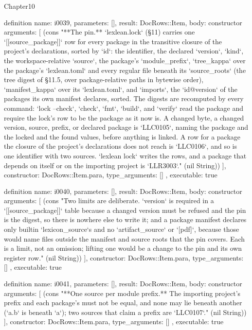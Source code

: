 \begin{lexlean}{Chapter10}
\begin{semanticmodule}
definition{
  name: i0039,
  parameters: [],
  result: DocRows::Item,
  body: constructor{
    arguments: [
      (cons "**The pin.** `lexlean.lock` (§11) carries one `[[source_package]]` row for every package in the transitive closure of the project's declarations, sorted by `id`: the identifier, the declared `version`, `kind`, the workspace-relative `source`, the package's `module_prefix`, `tree_kappa` over the package's `lexlean.toml` and every regular file beneath its `source_roots` (the tree digest of §11.5, over package-relative paths in bytewise order), `manifest_kappa` over its `lexlean.toml`, and `imports`, the `id@version` of the packages its own manifest declares, sorted. The digests are recomputed by every command: `lock --check`, `check`, `fmt`, `build`, and `verify` read the package and require the lock's row to be the package as it now is. A changed byte, a changed version, source, prefix, or declared package is `LLC0105`, naming the package and the locked and the found values, before anything is linked. A row for a package the closure of the project's declarations does not reach is `LLC0106`, and so is one identifier with two sources. `lexlean lock` writes the rows, and a package that depends on itself or on the importing project is `LLR3003`." (nil String))
    ],
    constructor: DocRows::Item.para,
    type_arguments: []
  },
  executable: true
}

definition{
  name: i0040,
  parameters: [],
  result: DocRows::Item,
  body: constructor{
    arguments: [
      (cons "Two limits are deliberate. `version` is required in a `[[source_package]]` table because a changed version must be refused and the pin is the digest, so there is nowhere else to write it; and a package manifest declares only builtin `lexicon_source`s and no `artifact_source` or `[pdf]`, because those would name files outside the manifest and source roots that the pin covers. Each is a limit, not an omission; lifting one would be a change to the pin and its own register row." (nil String))
    ],
    constructor: DocRows::Item.para,
    type_arguments: []
  },
  executable: true
}

definition{
  name: i0041,
  parameters: [],
  result: DocRows::Item,
  body: constructor{
    arguments: [
      (cons "**One source per module prefix.** The importing project's prefix and each package's must not be equal, and none may lie beneath another (`a.b` is beneath `a`); two sources that claim a prefix are `LLC0107`." (nil String))
    ],
    constructor: DocRows::Item.para,
    type_arguments: []
  },
  executable: true
}


\end{semanticmodule}
\end{lexlean}
